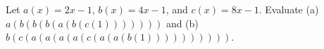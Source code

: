 Let $a(x)=2x-1$, $b(x)=4x-1$, and $c(x)=8x-1$. Evaluate (a) $a(b(b(b(a(b(c(1)))))))$ and (b) $b(c(a(a(a(a(c(a(a(b(1))))))))))$.
